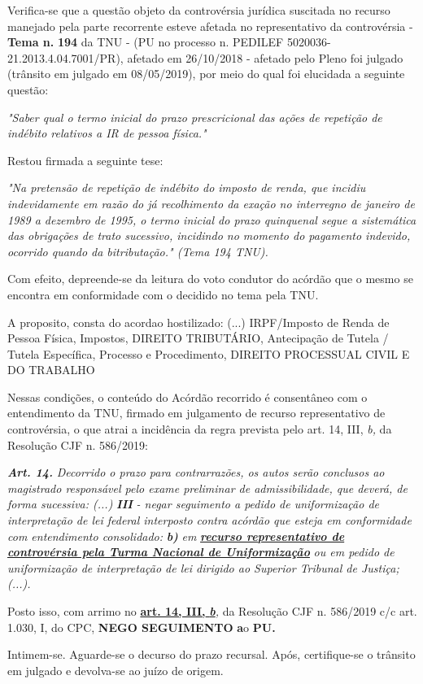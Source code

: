 \documentclass[12pt]{article}
\begin{document}
\justifying
\noindent Verifica-se que a questão objeto da controvérsia jurídica suscitada no recurso manejado pela parte recorrente esteve afetada no representativo da controvérsia - \textbf{Tema n. }\textbf{194} da TNU - (PU no processo n. PEDILEF 5020036-21.2013.4.04.7001/PR),  afetado em 26/10/2018 - afetado pelo Pleno foi julgado (trânsito em julgado em 08/05/2019), por meio do qual foi elucidada a seguinte questão:

\noindent \textit{"Saber qual o termo inicial do prazo prescricional das ações de repetição de indébito relativos a IR de pessoa física."}

\noindent Restou firmada a seguinte tese:

\noindent \textit{"Na pretensão de repetição de indébito do imposto de renda, que incidiu indevidamente em razão do já recolhimento da exação no interregno de janeiro de 1989 a dezembro de 1995, o termo inicial do prazo quinquenal segue a sistemática das obrigações de trato sucessivo, incidindo no momento do pagamento indevido, ocorrido quando da bitributação." (Tema 194 TNU).}

\noindent Com efeito, depreende-se da leitura do voto condutor do acórdão que o mesmo se encontra em conformidade com o decidido no  tema pela TNU.

\noindent A proposito, consta do acordao hostilizado: (...) IRPF/Imposto de Renda de Pessoa Física, Impostos, DIREITO TRIBUTÁRIO, Antecipação de Tutela / Tutela Específica, Processo e Procedimento, DIREITO PROCESSUAL CIVIL E DO TRABALHO

\noindent Nessas condições, o conteúdo do Acórdão recorrido é consentâneo com o entendimento da TNU, firmado em julgamento de recurso representativo de controvérsia, o que atrai a incidência da regra prevista pelo art. 14, III, \textit{b,} da Resolução CJF n. 586/2019:

\noindent \textit{\textbf{Art. 14.}}\textit{ Decorrido o prazo para contrarrazões, os autos serão conclusos ao magistrado responsável pelo exame preliminar de admissibilidade, que deverá, de forma sucessiva: (...) }\textit{\textbf{III }}\textit{- negar seguimento a pedido de uniformização de interpretação de lei federal interposto contra acórdão que esteja em conformidade com entendimento consolidado: }\textit{\textbf{b)}}\textit{ em }\uline{\textit{\textbf{recurso representativo de controvérsia pela Turma Nacional de Uniformização}}}\textit{ ou em pedido de uniformização de interpretação de lei dirigido ao Superior Tribunal de Justiça;(...).}

\noindent Posto isso, com arrimo no \uline{\textbf{art. 14, III, }}\uline{\textit{\textbf{b}}}\textit{,} da Resolução CJF n. 586/2019 c/c art. 1.030, I, do CPC, \textbf{NEGO SEGUIMENTO }\textbf{a}o\textbf{ PU}\textbf{.}

\noindent Intimem-se. Aguarde-se o decurso do prazo recursal. Após, certifique-se o trânsito em julgado e devolva-se ao juízo de origem.
\end{document}

